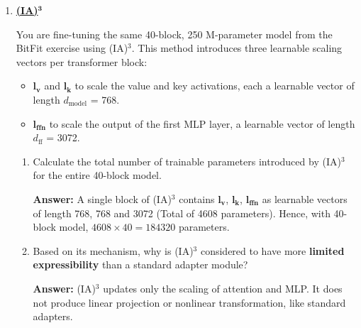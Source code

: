 \documentclass[11pt]{article}
\begin{document}
\begin{enumerate}[label=(\alph*)]
\begin{enumerate}[label=(\roman*)]
        \item Explain why this method, despite its parameter efficiency, significantly increases inference latency compared to a method like (IA)\(^3\).
        
        \textbf{Answer:} First, GeLU preserves small input signals, unlike ReLU.
        Also, a (sequential/parallel) adapter allows its parameters to be fully updated, and might help generalization.
    \end{enumerate}

    \item \href{https://arxiv.org/abs/2205.05638}{\textbf{(IA)\(^\mathbf{3}\)}}
    
    You are fine-tuning the same 40-block, 250 M-parameter model from the BitFit exercise using (IA)\(^3\).
    This method introduces three learnable scaling vectors per transformer block:
    \begin{itemize}
        \item \(\mathbf{l_v}\) and \(\mathbf{l_k}\) to scale the value and key activations, each a learnable vector of length \(d_\text{model}\) = 768.
        \item \(\mathbf{l_{ffn}}\) to scale the output of the first MLP layer, a learnable vector of length \(d_\text{ff}\) = 3072.
    \end{itemize}

    \begin{enumerate}[label=(\roman*)]
        \item Calculate the total number of trainable parameters introduced by (IA)\(^3\) for the entire 40-block model.
        
        \textbf{Answer:} A single block of (IA)\(^3\) contains \(\mathbf{l_v}\), \(\mathbf{l_k}\), \(\mathbf{l_{ffn}}\) as learnable vectors of length 768, 768 and 3072 (Total of 4608 parameters).
        Hence, with 40-block model, \(4608 \times 40 = 184320\) parameters.

        \item Based on its mechanism, why is (IA)\(^3\) considered to have more \textbf{limited expressibility} than a standard adapter module?
        
        \textbf{Answer:} (IA)\(^3\) updates only the scaling of attention and MLP.
        It does not produce linear projection or nonlinear transformation, like standard adapters.         
    \end{enumerate}
\end{enumerate}
\end{document}
